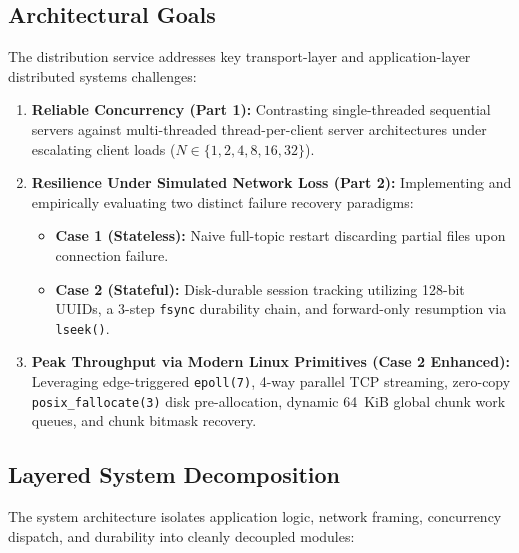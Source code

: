 \documentclass[11pt,a4paper]{article}
\begin{document}
\subsection{Architectural Goals}
The distribution service addresses key transport-layer and application-layer distributed systems challenges:
\begin{enumerate}[leftmargin=*]
    \item \textbf{Reliable Concurrency (Part 1):} Contrasting single-threaded sequential servers against multi-threaded thread-per-client server architectures under escalating client loads ($N \in \{1, 2, 4, 8, 16, 32\}$).
    \item \textbf{Resilience Under Simulated Network Loss (Part 2):} Implementing and empirically evaluating two distinct failure recovery paradigms:
    \begin{itemize}
        \item \textbf{Case 1 (Stateless):} Naive full-topic restart discarding partial files upon connection failure.
        \item \textbf{Case 2 (Stateful):} Disk-durable session tracking utilizing 128-bit UUIDs, a 3-step \texttt{fsync} durability chain, and forward-only resumption via \texttt{lseek()}.
    \end{itemize}
    \item \textbf{Peak Throughput via Modern Linux Primitives (Case 2 Enhanced):} Leveraging edge-triggered \texttt{epoll(7)}, 4-way parallel TCP streaming, zero-copy \texttt{posix\_fallocate(3)} disk pre-allocation, dynamic 64~KiB global chunk work queues, and chunk bitmask recovery.
\end{enumerate}

\subsection{Layered System Decomposition}
The system architecture isolates application logic, network framing, concurrency dispatch, and durability into cleanly decoupled modules:
\end{document}
